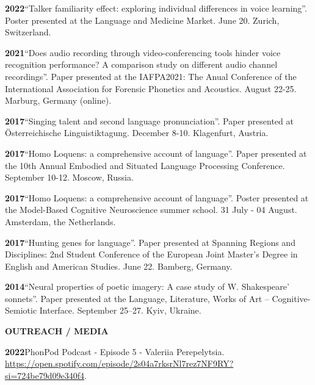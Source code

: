 \documentclass[11pt]{article}
\newcommand{\hangpara}{
 \setlength{\parindent}{0in} %
 \hangindent=0.42in %
}
\begin{document}
\vskip 6pt
\hangpara
{\bf 2022}\hspace{1ex}“Talker familiarity effect: exploring individual differences in voice learning”. Poster presented at the Language and Medicine Market. June 20. Zurich, Switzerland.


\vskip 6pt
\hangpara
{\bf 2021}\hspace{1ex}“Does audio recording through video-conferencing tools hinder voice recognition performance? A comparison study on different audio channel recordings”. Paper presented at the IAFPA2021: The Anual Conference of the International Association for Forensic Phonetics and Acoustics. August 22-25. Marburg, Germany (online).


\vskip 6pt
\hangpara
{\bf 2017}\hspace{1ex}“Singing talent and second language pronunciation”. Paper presented at Österreichische Linguistiktagung. December 8-10. Klagenfurt, Austria.


\vskip 6pt
\hangpara
{\bf 2017}\hspace{1ex}“Homo Loquens: a comprehensive account of language”. Paper presented at the 10th Annual Embodied and Situated Language Processing Conference. September 10-12. Moscow, Russia.


\vskip 6pt
\hangpara
{\bf 2017}\hspace{1ex}“Homo Loquens: a comprehensive account of language”. Poster presented at the Model-Based Cognitive Neuroscience summer school. 31 July - 04 August. Amsterdam, the Netherlands.


\vskip 6pt
\hangpara
{\bf 2017}\hspace{1ex}“Hunting genes for language”. Paper presented at Spanning Regions and Disciplines: 2nd Student Conference of the European Joint Master's Degree in English and American Studies. June 22. Bamberg, Germany.


\vskip 6pt
\hangpara
{\bf 2014}\hspace{1ex}“Neural properties of poetic imagery: A case study of W. Shakespeare’ sonnets”. Paper presented at the Language, Literature, Works of Art – Cognitive-Semiotic Interface. September 25--27. Kyiv, Ukraine.


\vskip 20pt
\begin{flushleft}
{\bf OUTREACH / MEDIA}
\end{flushleft}

\hangpara
{\bf 2022}\hspace{1ex}PhonPod Podcast - Episode 5 - Valeriia Perepelytsia. \url{https://open.spotify.com/episode/2s04a7rksrNl7rez7NF9RY?si=724be79d09e340f4}.
\end{document}
